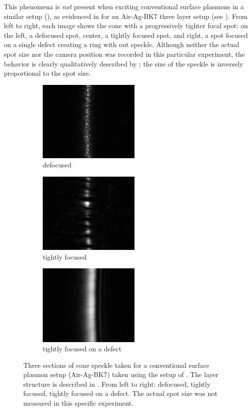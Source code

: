 This phenomena is \textit{not} present when exciting conventional surface
plasmons in a similar setup (), as evidenced in
 for an Air-Ag-BK7 three layer setup (see
).  From left to right, each image shows the cone
with a progressively tighter focal spot: on the left, a defocused spot,
center, a tightly focused spot, and right, a spot focused on a single defect
creating a ring with out speckle.  Although neither the actual spot size nor
the camera position was recorded in this particular experiment, the behavior
is clearly qualitatively described by ; the size of
the speckle is inversely proportional to the spot size.
\begin{figure}[ht]
\centering
\begin{subfigure}[b]{5cm}
\includegraphics[keepaspectratio,width=5cm]{speckle/figures/Ag_BK7_cone_lens00_ccd-10.jpg}
\caption{defocused}
\end{subfigure}
\begin{subfigure}[b]{5cm}
\includegraphics[keepaspectratio,width=5cm]{speckle/figures/Ag_BK7_cone_lens10_ccd-5.jpg}
\caption{tightly focused}
\end{subfigure}
\begin{subfigure}[b]{5cm}
\includegraphics[keepaspectratio,width=5cm]{speckle/figures/Ag_LaSFN9_cone_lens10_ccd-153.jpg}
\caption{tightly focused on a defect}
\end{subfigure}
\caption{Three sections of cone speckle taken for a conventional surface
				plasmon setup (Air-Ag-BK7) taken using the setup of
				.  The layer structure is described in
				.  From left to right: defocused, tightly
focused, tightly focused on a defect.  The actual spot size was not measured
in this specific experiment.  }
\label{fig:threespecklesizes}
\end{figure}

